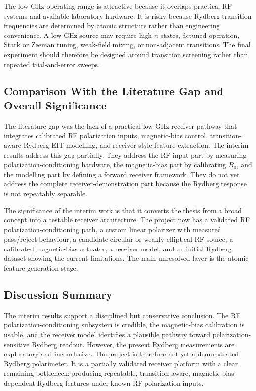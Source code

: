 \documentclass{ieeeaccess}
\begin{document}
The low-GHz operating range is attractive because it overlaps practical RF systems and available laboratory hardware. It is risky because Rydberg transition frequencies are determined by atomic structure rather than engineering convenience. A low-GHz source may require high-\(n\) states, detuned operation, Stark or Zeeman tuning, weak-field mixing, or non-adjacent transitions. The final experiment should therefore be designed around transition screening rather than repeated trial-and-error sweeps.

\subsection{Comparison With the Literature Gap and Overall Significance}
\label{subsec:discussion_significance}

The literature gap was the lack of a practical low-GHz receiver pathway that integrates calibrated RF polarization inputs, magnetic-bias control, transition-aware Rydberg-EIT modelling, and receiver-style feature extraction. The interim results address this gap partially. They address the RF-input part by measuring polarization-conditioning hardware, the magnetic-bias part by calibrating \(B_0\), and the modelling part by defining a forward receiver framework. They do not yet address the complete receiver-demonstration part because the Rydberg response is not repeatably separable.

The significance of the interim work is that it converts the thesis from a broad concept into a testable receiver architecture. The project now has a validated RF polarization-conditioning path, a custom linear polarizer with measured pass/reject behaviour, a candidate circular or weakly elliptical RF source, a calibrated magnetic-bias actuator, a receiver model, and an initial Rydberg dataset showing the current limitations. The main unresolved layer is the atomic feature-generation stage.

\subsection{Discussion Summary}
\label{subsec:discussion_summary}

The interim results support a disciplined but conservative conclusion. The RF polarization-conditioning subsystem is credible, the magnetic-bias calibration is usable, and the receiver model identifies a plausible pathway toward polarization-sensitive Rydberg readout. However, the present Rydberg measurements are exploratory and inconclusive. The project is therefore not yet a demonstrated Rydberg polarimeter. It is a partially validated receiver platform with a clear remaining bottleneck: producing repeatable, transition-aware, magnetic-bias-dependent Rydberg features under known RF polarization inputs.
\end{document}

